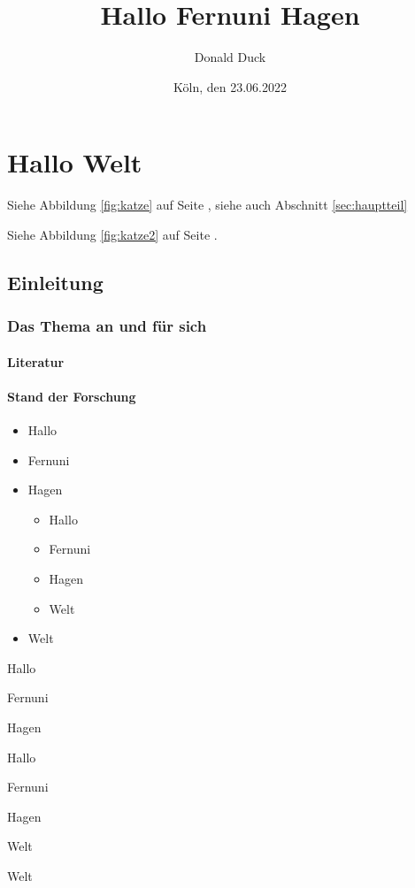 \documentclass[12pt,ngerman,parskip=half]{scrreprt}
\author{Donald Duck}
\title{Hallo Fernuni Hagen}
\date{Köln, den 23.06.2022}
\begin{document}
\maketitle

\tableofcontents

\listoffigures

\listoftables

\chapter{Hallo Welt}

Siehe Abbildung \ref{fig:katze} auf Seite \pageref{fig:katze}, siehe auch Abschnitt \ref{sec:hauptteil}

Siehe Abbildung \ref{fig:katze2} auf Seite \pageref{fig:katze2}.

\section{Einleitung}
\subsection{Das Thema an und für sich}
\subsubsection{Literatur}

\blindtext[2] 

\subsubsection{Stand der Forschung}

\blindtext[1] 


\begin{itemize} %
\item Hallo
\item Fernuni
\item Hagen
\begin{itemize}[+]
\item Hallo
\item Fernuni
\item Hagen
\item Welt
\end{itemize}
\item Welt
\end{itemize}

\begin{compactitem}[\%] %
\item Hallo
\item Fernuni
\item Hagen
\begin{compactitem}[+]
\item Hallo
\item Fernuni
\item Hagen
\item Welt
\end{compactitem}
\item Welt
\end{compactitem}
\end{document}
